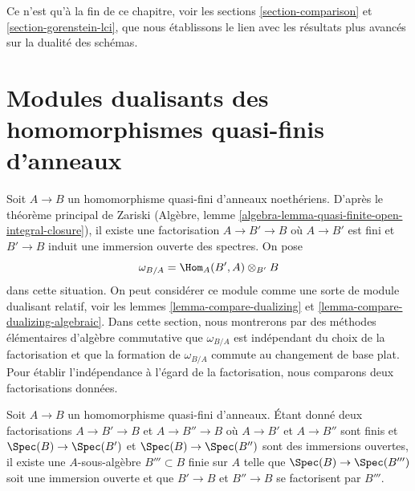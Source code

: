 \medskip\noindent
Ce n'est qu'à la fin de ce chapitre, voir
les sections \ref{section-comparison} et \ref{section-gorenstein-lci},
que nous établissons le lien avec les résultats plus avancés
sur la dualité des schémas.








\section{Modules dualisants des homomorphismes quasi-finis d'anneaux}
\label{section-quasi-finite-dualizing}

\noindent
Soit $A \to B$ un homomorphisme quasi-fini d'anneaux noethériens. D'après
le théorème principal de Zariski
(Algèbre, lemme \ref{algebra-lemma-quasi-finite-open-integral-closure}),
il existe une factorisation $A \to B' \to B$ où
$A \to B'$ est fini et $B' \to B$ induit une immersion ouverte des spectres.
On pose
\begin{equation}
\label{equation-dualizing}
\omega_{B/A} = \Hom_A(B', A) \otimes_{B'} B
\end{equation}
dans cette situation. On peut considérer ce module comme une sorte de module
dualisant relatif, voir les lemmes \ref{lemma-compare-dualizing} et
\ref{lemma-compare-dualizing-algebraic}.
Dans cette section, nous montrerons par des méthodes élémentaires d'algèbre commutative
que $\omega_{B/A}$ est indépendant du choix de la factorisation
et que la formation de $\omega_{B/A}$ commute au changement de base plat.
Pour établir l'indépendance à l'égard de la factorisation, nous comparons deux
factorisations données.

\begin{lemma}
\label{lemma-dominate-factorizations}
Soit $A \to B$ un homomorphisme quasi-fini d'anneaux. Étant donné deux factorisations
$A \to B' \to B$ et $A \to B'' \to B$ où
$A \to B'$ et $A \to B''$ sont finis et $\Spec(B) \to \Spec(B')$
et $\Spec(B) \to \Spec(B'')$ sont des immersions ouvertes, il existe
une $A$-sous-algèbre $B''' \subset B$ finie sur $A$ telle que
$\Spec(B) \to \Spec(B''')$ soit une immersion ouverte et que $B' \to B$ et
$B'' \to B$ se factorisent par $B'''$.
\end{lemma}

